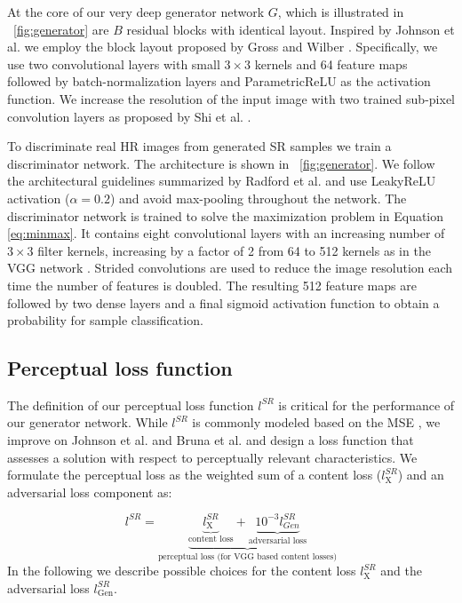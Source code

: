 \documentclass[10pt,twocolumn,letterpaper]{article}
\begin{document}
At the core of our very deep generator network $G$, which is illustrated in \figurename~\ref{fig:generator} are $B$ residual blocks with identical layout. Inspired by Johnson et al. \cite{Johnson16PercepLoss} we employ the block layout proposed by Gross and Wilber \cite{gross2016}. Specifically, we use two convolutional layers with small $3\times3$ kernels and 64 feature maps followed by batch-normalization layers \cite{Ioffe2015} and ParametricReLU \cite{He2015relu} as the activation function.
We increase the resolution of the input image with two trained sub-pixel convolution layers as proposed by Shi et al. \cite{Shi2016ESPCN}.

To discriminate real \ac{HR} images from generated \ac{SR} samples we train a discriminator network. The architecture is shown in \figurename~\ref{fig:generator}.
	We follow the architectural guidelines summarized by Radford et al. \cite{Radford2015} and use LeakyReLU activation ($\alpha=0.2$) and avoid max-pooling throughout the network. The discriminator network is trained to solve the maximization problem in Equation \ref{eq:minmax}. It contains eight convolutional layers with an increasing number of $3\times3$ filter kernels, increasing by a factor of 2 from 64 to 512 kernels as in the VGG network \cite{simonyan2014very}. Strided convolutions are used to reduce the image resolution each time the number of features is doubled. The resulting 512 feature maps are followed by two dense layers and a final sigmoid activation function to obtain a probability for sample classification.

\subsection{Perceptual loss function}
\label{sec:losses}
The definition of our perceptual loss function $l^{SR}$  is critical for the performance of our generator network.
While $l^{SR}$ is commonly modeled based on the \ac{MSE}  \cite{dong2016image,Shi2016ESPCN}, we improve on Johnson et al. \cite{Johnson16PercepLoss} and Bruna et al. \cite{bruna2016super} and design a loss function that assesses a solution with respect to perceptually relevant characteristics.
We formulate the perceptual loss as the weighted sum of a content loss ($l^{SR}_\textrm{X}$) and an adversarial loss component as:

\begin{equation}
	l^{SR} = \underbrace{\underbrace{l^{SR}_\textrm{X}}_{\text{content loss}} + \underbrace{10^{-3} l^{SR}_{Gen}}_{\text{adversarial loss}}}_{\text{perceptual loss (for VGG based content losses)}}
\end{equation}
In the following we describe possible choices for the content loss $l^{SR}_\textrm{X}$ and the adversarial loss $l^{SR}_\textrm{Gen}$.
\end{document}
